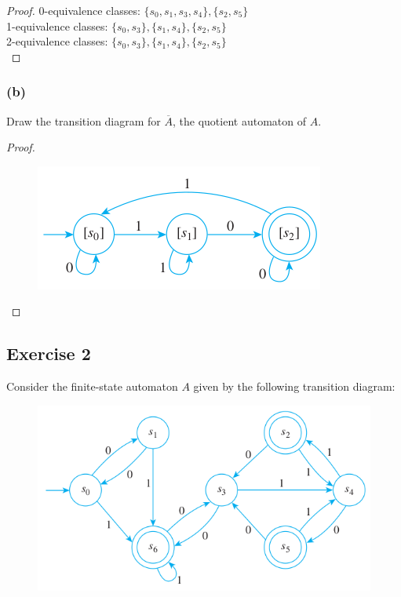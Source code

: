 \documentclass[14pt]{extarticle}
\begin{document}
\begin{proof}
0-equivalence classes: \(\{s_0, s_1, s_3, s_4\}, \{s_2, s_5\}\) \\
1-equivalence classes: \(\{s_0, s_3\}, \{s_1, s_4\}, \{s_2, s_5\}\) \\
2-equivalence classes: \(\{s_0, s_3\}, \{s_1, s_4\}, \{s_2, s_5\}\) \\
\end{proof}

\subsubsection{(b)}
Draw the transition diagram for \(\overline{A}\), the quotient automaton of \(A\).

\begin{proof}
\begin{figure}[ht!]
\centering
\includegraphics[scale=0.5]{../images/12.3.1.b.png}
\end{figure}
\end{proof}

\subsection{Exercise 2}
Consider the finite-state automaton \(A\) given by the following transition diagram:

\begin{figure}[ht!]
\centering
\includegraphics[scale=0.5]{../images/12.3.2.png}
\end{figure}
\end{document}
